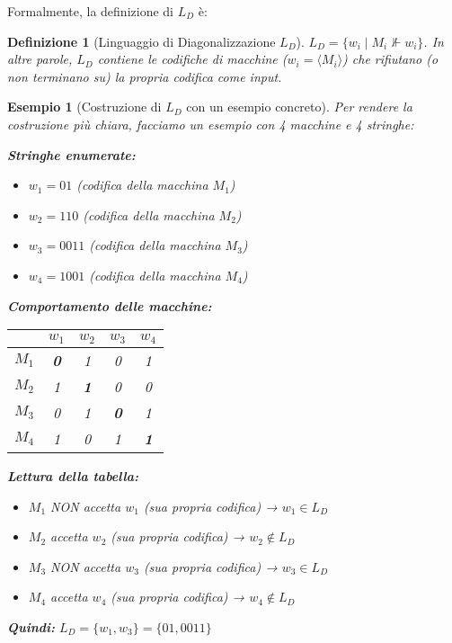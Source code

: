 \documentclass[a4paper]{article}
\newtheorem{definition}{Definizione}
\newtheorem{example}{Esempio}
\theoremstyle{remark} %
\begin{document}
Formalmente, la definizione di $L_D$ è:
\begin{definition}[Linguaggio di Diagonalizzazione $L_D$]
$L_D = \{ w_i \mid M_i \nVdash w_i \}$.
In altre parole, $L_D$ contiene le codifiche di macchine ($w_i = \langle M_i \rangle$) che rifiutano (o non terminano su) la propria codifica come input.
\end{definition}

\begin{example}[Costruzione di $L_D$ con un esempio concreto]
Per rendere la costruzione più chiara, facciamo un esempio con 4 macchine e 4 stringhe:

\textbf{Stringhe enumerate:}
\begin{itemize}
    \item $w_1 = 01$ (codifica della macchina $M_1$)
    \item $w_2 = 110$ (codifica della macchina $M_2$)
    \item $w_3 = 0011$ (codifica della macchina $M_3$)
    \item $w_4 = 1001$ (codifica della macchina $M_4$)
\end{itemize}

\textbf{Comportamento delle macchine:}
\begin{center}
\begin{tabular}{c|cccc}
 & $w_1$ & $w_2$ & $w_3$ & $w_4$ \\
\hline
$M_1$ & \textbf{0} & 1 & 0 & 1 \\
$M_2$ & 1 & \textbf{1} & 0 & 0 \\
$M_3$ & 0 & 1 & \textbf{0} & 1 \\
$M_4$ & 1 & 0 & 1 & \textbf{1} \\
\end{tabular}
\end{center}

\textbf{Lettura della tabella:}
\begin{itemize}
    \item $M_1$ NON accetta $w_1$ (sua propria codifica) → $w_1 \in L_D$
    \item $M_2$ accetta $w_2$ (sua propria codifica) → $w_2 \notin L_D$
    \item $M_3$ NON accetta $w_3$ (sua propria codifica) → $w_3 \in L_D$
    \item $M_4$ accetta $w_4$ (sua propria codifica) → $w_4 \notin L_D$
\end{itemize}

\textbf{Quindi:} $L_D = \{w_1, w_3\} = \{01, 0011\}$


\end{example}
\end{document}

